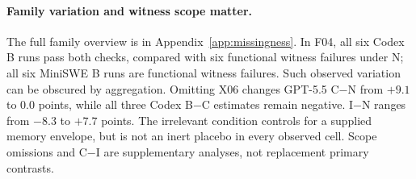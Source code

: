 \begin{table}[t]
\centering\small
\caption{Identification bounds for $\Delta U$ in percentage points over all thirteen families and recorded repetitions, retaining explicitly completed measurements. These are favorable and unfavorable assignments of unresolved outcomes, not confidence intervals.}
\label{tab:bounds}
\end{table}

\paragraph{Family variation and witness scope matter.}
The full family overview is in Appendix~\ref{app:missingness}. In F04, all six Codex B runs pass both checks, compared with six functional witness failures under N; all six MiniSWE B runs are functional witness failures. Such observed variation can be obscured by aggregation. Omitting X06 changes GPT-5.5 C$-$N from $+9.1$ to 0.0 points, while all three Codex B$-$C estimates remain negative. I$-$N ranges from $-8.3$ to $+7.7$ points. The irrelevant condition controls for a supplied memory envelope, but is not an inert placebo in every observed cell. Scope omissions and C$-$I are supplementary analyses, not replacement primary contrasts.
